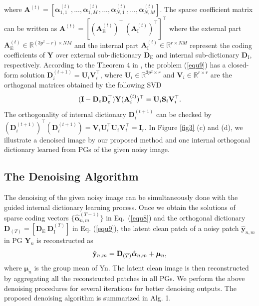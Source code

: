 \documentclass[10pt,twocolumn,letterpaper]{article}
\begin{document}
where $\textbf{A}^{(t)}=[\bm{\alpha}_{1,1}^{(t)},...,\bm{\alpha}_{1,M}^{(t)},...,\bm{\alpha}_{N,1}^{(t)},...,\bm{\alpha}_{N,M}^{(t)}]$. The sparse coefficient matrix can be written as $\mathbf{A}^{(t)}=[(\mathbf{A}_{\text{E}}^{(t)})^{\top}\ (\mathbf{A}_{\text{I}}^{(t)})^{\top}]^{\top}$ where the external part $\mathbf{A}_{\text{E}}^{(t)}\in\mathbb{R}^{(3p^2-r)\times NM}$ and the internal part $\mathbf{A}_{\text{I}}^{(t)}\in\mathbb{R}^{r\times NM}$ represent the coding coefficients of $\mathbf{Y}$ over external sub-dictionary $\mathbf{D}_{\text{E}}$ and internal sub-dictionary $\mathbf{D}_{\text{I}}$, respectively. According to the Theorem 4 in \cite{spca}, the problem (\ref{equ9}) has a closed-form solution $\mathbf{D}_{i}^{(t+1)}=\mathbf{U}_{i}\mathbf{V}_{i}^{\top}$, where $\mathbf{U}_{i}\in\mathbb{R}^{3p^2\times r}$ and $\mathbf{V}_{i}\in\mathbb{R}^{r\times r}$ are the orthogonal matrices obtained by the following SVD
\vspace{-1mm}
\begin{equation}\label{equ10}\vspace{-2mm}
(\mathbf{I}-\mathbf{D}_{e}\mathbf{D}_{e}^{\top})\mathbf{Y}(\mathbf{A}_{i}^{(t)})^{\top}
=
\mathbf{U}_{i}\mathbf{S}_{i}\mathbf{V}_{i}^{\top}.
\end{equation}
The orthogonality of internal dictionary $\mathbf{D}_{i}^{(t+1)}$ can be checked by 
$(\mathbf{D}_{i}^{(t+1)})^{\top}(\mathbf{D}_{i}^{(t+1)})=\mathbf{V}_{i}\mathbf{U}_{i}^{\top}\mathbf{U}_{i}\mathbf{V}_{i}^{\top}=\mathbf{I}_{r}$. In Figure \ref{fig3} (c) and (d), we illustrate a denoised image by our proposed method and one internal orthogonal dictionary learned from PGs of the given noisy image.

\subsection{The Denoising Algorithm}

The denoising of the given noisy image can be simultaneously done with the guided internal dictionary learning process. Once we obtain the solutions of sparse coding vectors $\{\hat{\bm{\alpha}}_{n,m}^{(T-1)}\}$ in Eq.\ (\ref{equ8}) and the orthogonal dictionary $\mathbf{D}_{(T)} = [\mathbf{D}_{\text{E}}\ \mathbf{D}_{\text{I}}^{(T)}]$ in Eq. (\ref{equ9}), the latent clean patch of a noisy patch $\hat{\mathbf{y}}_{n,m}$ in PG $\mathbf{Y}_{n}$ is reconstructed as
\vspace{-2mm}
\begin{equation}\label{equ11}\vspace{-2mm}
\hat{\mathbf{y}}_{n,m}=\mathbf{D}_{(T)}\hat{\bm{\alpha}}_{n,m}+\bm{\mu}_{n},
\end{equation}
where $\bm{\mu}_{n}$ is the group mean of Yn. The latent clean image is then reconstructed by aggregating all the reconstructed patches in all PGs. We perform the above denoising procedures for several iterations for better denoising outputs. The proposed denoising algorithm is summarized in Alg. 1.
\end{document}
